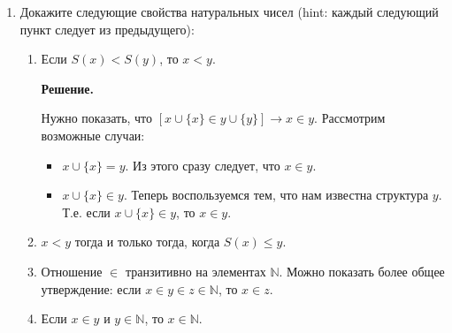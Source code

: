 \begin{enumerate}
\item Докажите следующие свойства натуральных чисел (hint: каждый следующий пункт следует из предыдущего):
\begin{enumerate}
\item Если $S(x) < S(y)$, то $x < y$.

\textbf{Решение.}

Нужно показать, что $\left[x \cup \{x\} \in y \cup \{y\}\right] \to x \in y$. Рассмотрим возможные случаи:
\begin{itemize}
	\item $x \cup \{x\} = y$. Из этого сразу следует, что $x \in y$.
	\item $x \cup \{x\} \in y$. Теперь воспользуемся тем, что нам известна структура $y$. Т.е. если $x \cup \{x\} \in 
	y$, то $x \in y$.
\end{itemize}
\item $x < y$ тогда и только тогда, когда $S(x) \leq y$.
\item Отношение $\in$ транзитивно на элементах $\mathbb{N}$.
    Можно показать более общее утверждение: если $x \in y \in z \in \mathbb{N}$, то $x \in z$.
\item Если $x \in y$ и $y \in \mathbb{N}$, то $x \in \mathbb{N}$.
\end{enumerate}

\end{enumerate}

